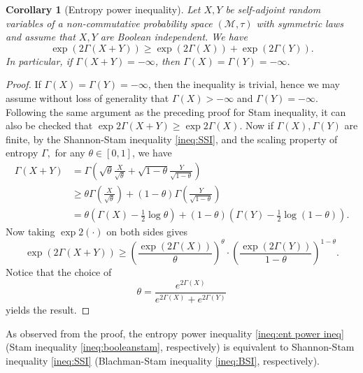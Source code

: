 \documentclass[10pt, reqno]{amsart}
\numberwithin{equation}{section}
\theoremstyle{definition}
\theoremstyle{plain}
\newtheorem{corollary}[definition]{Corollary}
\theoremstyle{remark}
\newcommand{\1}{\mathbbm{1}}
\begin{document}
	\begin{corollary}[Entropy power inequality]\label{cor:ent power ineq}
	Let $X,Y$ be self-adjoint random variables of a non-commutative probability space $(\mathcal{M},\tau)$ with symmetric laws and assume that $X,Y$ are Boolean independent. We have
	\begin{equation}\label{ineq:ent power ineq}
	 	\exp(2\Gamma(X+Y))\ge \exp(2\Gamma(X)) + \exp(2\Gamma(Y)).
	\end{equation}
    In particular, if $\Gamma(X+Y)=-\infty$, then $\Gamma(X)=\Gamma(Y)=-\infty$.
	\end{corollary}
	\begin{proof}
	    If $\Gamma(X)=\Gamma(Y)=-\infty$, then the inequality is trivial, hence we may assume without loss of generality that $\Gamma(X)>-\infty$ and $\Gamma(Y)=-\infty$. Following the same argument as the preceding proof for Stam inequality, it can also be checked that $\exp{2\Gamma(X+Y)}\ge \exp{2\Gamma(X)}$. Now if $\Gamma(X),\Gamma(Y)$ are finite, by the Shannon-Stam inequality \eqref{ineq:SSI}, and the scaling property of entropy $\Gamma,$ for any $\theta\in [0,1]$, we have
        \begin{align*}
			\Gamma(X+Y) &= \Gamma\left(\sqrt{\theta}\frac{X}{\sqrt{\theta}} + \sqrt{1-\theta}\frac{Y}{\sqrt{1-\theta}} \right)\\
			&\ge \theta \Gamma\left( \frac{X}{\sqrt{\theta}} \right) + (1-\theta)\Gamma\left( \frac{Y}{\sqrt{1-\theta}} \right)\\
			&= \theta \left(\Gamma(X) - \frac{1}{2}\log \theta\right) + (1-\theta)\left(\Gamma(Y) - \frac{1}{2}\log(1-\theta)\right).
		\end{align*}
        Now taking $\exp2(\cdot)$ on both sides gives
        \begin{equation*}
            \exp(2\Gamma(X+Y))\ge \left( \frac{\exp(2\Gamma(X))}{\theta}\right)^{\theta}\cdot \left( \frac{\exp(2\Gamma(Y))}{1-\theta}\right)^{1-\theta}.
        \end{equation*}
        Notice that the choice of  $$\theta=\frac{e^{2\Gamma(X)}}{e^{2\Gamma(X)} + e^{2\Gamma(Y)}}$$ yields the result.
	\end{proof}
    As observed from the proof, the entropy power inequality \eqref{ineq:ent power ineq} (Stam inequality \eqref{ineq:booleanstam}, respectively) is equivalent to Shannon-Stam inequality \eqref{ineq:SSI} (Blachman-Stam inequality \eqref{ineq:BSI}, respectively).
\end{document}
